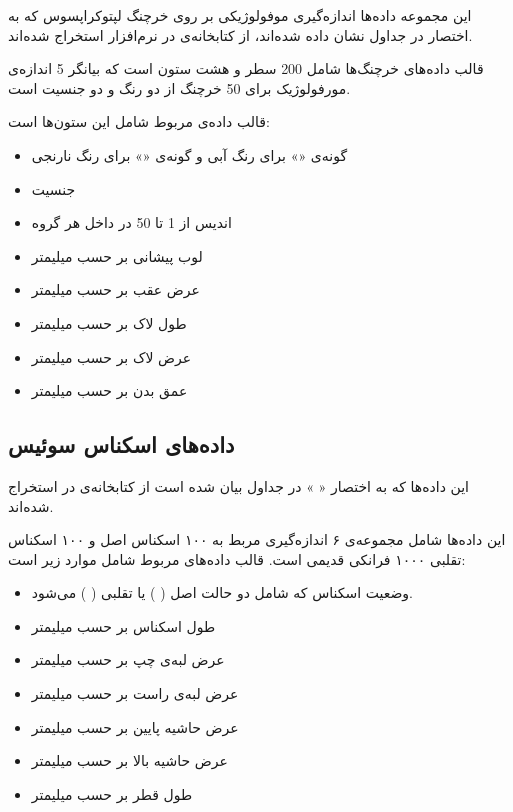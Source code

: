 این مجموعه داده‌ها اندازه‌گیری موفولوژیکی
بر روی خرچنگ لپتوکراپسوس  که به اختصار
در جداول نشان داده شده‌اند، از کتابخانه‌ی 
\cite{rMASS}
در نرم‌افزار 
استخراج شده‌اند.

قالب داده‌های خرچنگ‌ها شامل 200 سطر و هشت ستون است که بیانگر 5 اندازه‌ی مورفولوژیک برای 50 خرچنگ از دو رنگ و دو جنسیت است.

قالب داده‌ی مربوط شامل این ستون‌ها است:

\begin{itemize}
\item
{}
گونه‌ی «» برای رنگ آبی و گونه‌ی «» برای رنگ نارنجی
\item
{}
جنسیت
\item
{}
اندیس از 1 تا 50 در داخل هر گروه
\item
{}
لوب پیشانی بر حسب میلیمتر
\item
{}
عرض عقب بر حسب میلیمتر
\item
{}
طول لاک بر حسب میلیمتر
\item
{}
عرض لاک بر حسب میلیمتر
\item
{}
عمق بدن بر حسب میلیمتر
\end{itemize}

\subsection{
داده‌های اسکناس سوئیس
}

این داده‌ها که به اختصار «
» در جداول بیان شده است از کتابخانه‌ی 
\cite{rmclust}
در 
استخراج شده‌اند.

این داده‌ها شامل مجموعه‌ی ۶ اندازه‌گیری مربط به ۱۰۰ اسکناس اصل و ۱۰۰ اسکناس تقلبی ۱۰۰۰ فرانکی قدیمی است. قالب داده‌های مربوط شامل موارد زیر است:

\begin{itemize}
\item
{}
وضعیت اسکناس که شامل دو حالت اصل (%
%
)
یا تقلبی (%
%
) می‌شود.
\item
{}
طول اسکناس بر حسب میلیمتر
\item
{}
عرض لبه‌ی چپ بر حسب میلیمتر
\item
{}
عرض لبه‌ی راست بر حسب میلیمتر
\item
{}
عرض حاشیه پایین بر حسب میلیمتر
\item
{}
عرض حاشیه بالا بر حسب میلیمتر
\item
{}
طول قطر بر حسب میلیمتر
\end{itemize}


